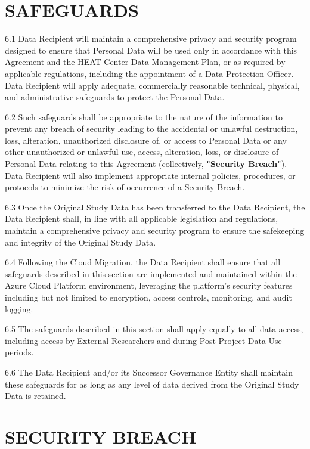 \documentclass[12pt,letterpaper]{article}
\newcommand{\added}[1]{\textcolor{addcolor}{#1}}
\begin{document}
\section{SAFEGUARDS}

6.1 Data Recipient will maintain a comprehensive privacy and security program designed to ensure that Personal Data will be used only in accordance with this Agreement and the HEAT Center Data Management Plan, or as required by applicable regulations, including the appointment of a Data Protection Officer. Data Recipient will apply adequate, commercially reasonable technical, physical, and administrative safeguards to protect the Personal Data.

6.2 Such safeguards shall be appropriate to the nature of the information to prevent any breach of security leading to the accidental or unlawful destruction, loss, alteration, unauthorized disclosure of, or access to Personal Data or any other unauthorized or unlawful use, access, alteration, loss, or disclosure of Personal Data relating to this Agreement (collectively, \textbf{"Security Breach"}). Data Recipient will also implement appropriate internal policies, procedures, or protocols to minimize the risk of occurrence of a Security Breach.

6.3 Once the Original Study Data has been transferred to the Data Recipient, the Data Recipient shall, in line with all applicable legislation and regulations, maintain a comprehensive privacy and security program to ensure the safekeeping and integrity of the Original Study Data.

\added{6.4 Following the Cloud Migration, the Data Recipient shall ensure that all safeguards described in this section are implemented and maintained within the Azure Cloud Platform environment, leveraging the platform's security features including but not limited to encryption, access controls, monitoring, and audit logging.}

\added{6.5 The safeguards described in this section shall apply equally to all data access, including access by External Researchers and during Post-Project Data Use periods.}

\added{6.6 The Data Recipient and/or its Successor Governance Entity shall maintain these safeguards for as long as any level of data derived from the Original Study Data is retained.}

\section{SECURITY BREACH}
\end{document}
